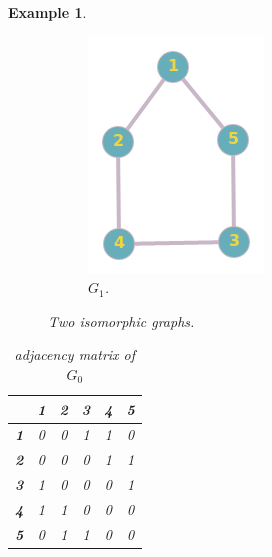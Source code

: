 \documentclass[12pt,a4paper]{article}
\newtheorem{exa}[thm]{Example}
\begin{document}
\begin{exa}
\begin{figure}[h!]
\begin{subfigure}[b]{.24\linewidth}
		\includegraphics[width=\linewidth]{ex1_2.png}
		\caption{$G_1$.}
	\end{subfigure}
	\caption{Two isomorphic graphs.}
	\label{fig:Two isomorphic graphs}
\end{figure}
\begin{table}[!htb]
	\begin{minipage}{.5\linewidth}
		
		\centering
		\begin{tabular}{|c|c|c|c|c|c|}
			\hline 
			& \textbf{1} & \textbf{2} & \textbf{3} & \textbf{4} & \textbf{5} \\ 
			\hline 
			\textbf{1} & 0 & 0 & 1 & 1 & 0 \\ 
			\hline 
			\textbf{2} & 0 & 0 & 0 & 1 & 1 \\ 
			\hline 
			\textbf{3} & 1 & 0 & 0 & 0 & 1 \\ 
			\hline 
			\textbf{4} & 1 & 1 & 0 & 0 & 0 \\ 
			\hline 
			\textbf{5} & 0 & 1 & 1 & 0 & 0 \\ 
			\hline  
		\end{tabular} 
	\caption{adjacency matrix of $G_0$}
	\end{minipage}%
	\begin{minipage}{.5\linewidth}
		\centering


\end{minipage}
\end{table}
\end{exa}
\end{document}
